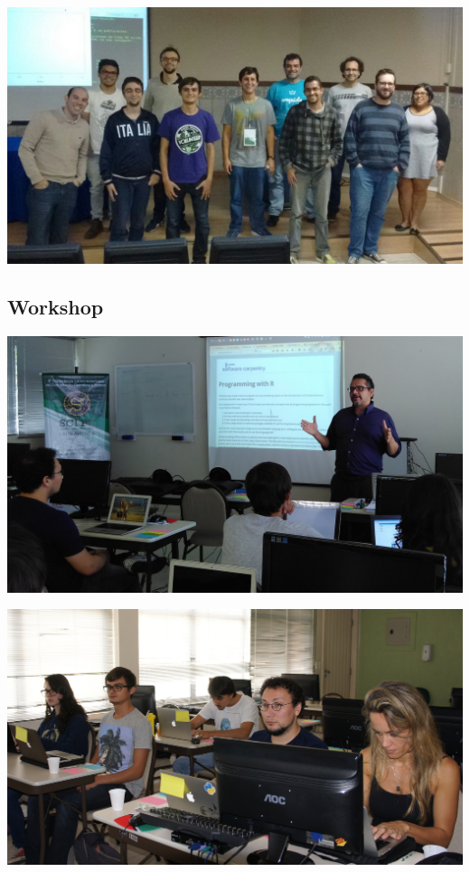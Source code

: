 \documentclass[12pt]{article}
\begin{document}
\noindent  %
\includegraphics[width=\textwidth]{tutorial-rpy.jpg}

\subsection*{Workshop}

\noindent  %
\includegraphics[width=\textwidth]{swc-francisco.jpg}

\noindent  %
\includegraphics[width=\textwidth]{swc-students.jpg}
\end{document}
